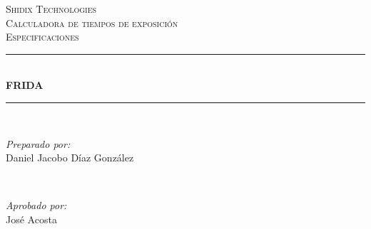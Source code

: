 \begin{titlepage}

\newcommand{\HRule}{\rule{\linewidth}{0.5mm}} %

\center %
 

\textsc{\LARGE Shidix Technologies}\\[1.5cm] %
\textsc{\Large Calculadora de tiempos de exposici\'on}\\[0.5cm] %
\textsc{\large Especificaciones}\\[0.5cm] %


\HRule \\[0.4cm]
{ \huge \bfseries FRIDA}\\[0.4cm] %
\HRule \\[1.5cm]
 

\begin{minipage}{0.4\textwidth}
\begin{flushleft} \large
\emph{Preparado por:}\\
Daniel Jacobo D\'iaz Gonz\'alez
\end{flushleft}
\end{minipage}
~
\begin{minipage}{0.4\textwidth}
\begin{flushright} \large
\emph{Aprobado por:} \\
Jos\'e Acosta
\end{flushright}
\end{minipage}\\[2cm]



\end{titlepage}
